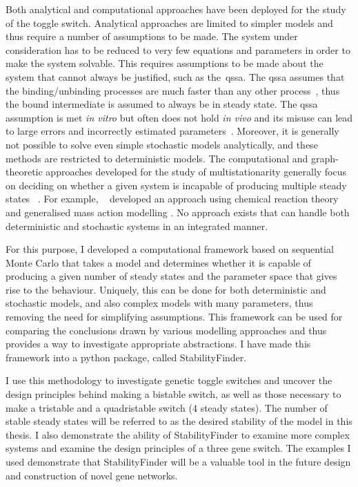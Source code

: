 Both analytical and computational approaches have been deployed for the study of the toggle switch. Analytical approaches are limited to simpler models and thus require a number of assumptions to be made. The system under consideration has to be reduced to very few equations and parameters in order to make the system solvable. This requires assumptions to be made about the system that cannot always be justified, such as the~\acrfull{qssa}. The \acrshort{qssa} assumes that the binding/unbinding processes are much faster than any other process~\autocite{Loinger:2007vma}, thus the bound intermediate is assumed to always be in steady state. The \acrshort{qssa} assumption is met \textit{in vitro} but often does not hold \textit{in vivo} and its misuse can lead to large errors and incorrectly estimated parameters~\autocite{Pedersen:2007ke}. Moreover, it is generally not possible to solve even simple stochastic models analytically, and these methods are restricted to deterministic models. The computational and graph-theoretic approaches developed for the study of multistationarity generally focus on deciding on whether a given system is incapable of producing multiple steady states ~\autocite{Conradi:2007jo, Banaji:2010fh,Feliu:2013dz}. For example, ~\textcite{Feliu:2013dz} developed an approach using chemical reaction theory and generalised mass action modelling \autocite{Feliu:2013dz}. No approach exists that can handle both deterministic and stochastic systems in an integrated manner.

For this purpose, I developed a computational framework based on sequential Monte Carlo that takes a model and determines whether it is capable of producing a given number of steady states and the parameter space that gives rise to the behaviour. Uniquely, this can be done for both deterministic and stochastic models, and also complex models with many parameters, thus removing the need for simplifying assumptions. This framework can be used for comparing the conclusions drawn by various modelling approaches and thus provides a way to investigate appropriate abstractions. I have made this framework into a python package, called StabilityFinder. 

I use this methodology to investigate genetic toggle switches and uncover the design principles behind making a bistable switch, as well as those necessary to make a tristable and a quadristable switch (4 steady states). The number of stable steady states will be referred to as the desired stability of the model in this thesis. I also demonstrate the ability of StabilityFinder to examine more complex systems and examine the design principles of a three gene switch. The examples I used demonstrate that StabilityFinder will be a valuable tool in the future design and construction of novel gene networks. 




